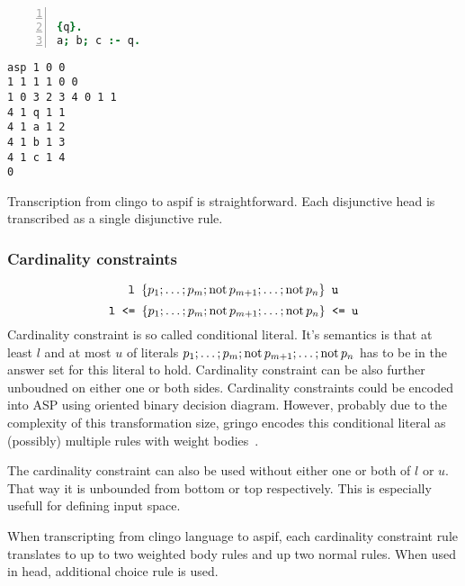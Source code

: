 \documentclass{fithesis}
\begin{document}
\begin{minipage}[t]{0.45\linewidth}
\centering
\begin{lstlisting}[language=prolog, numbers=left, countblanklines=false]

{q}.
a; b; c :- q.
\end{lstlisting}
\end{minipage}
\hspace{1em}
\begin{minipage}[t]{0.45\linewidth}
\centering
\begin{lstlisting}[numbers=right, countblanklines=false]
asp 1 0 0
1 1 1 1 0 0
1 0 3 2 3 4 0 1 1
4 1 q 1 1
4 1 a 1 2
4 1 b 1 3
4 1 c 1 4
0
\end{lstlisting}
\end{minipage}
Transcription from clingo to aspif is straightforward. Each disjunctive head
is transcribed as a single disjunctive rule.

\subsubsection{Cardinality constraints}

\begin{equation*}
    \texttt{l }\{p_1; \dots; p_m; \mathrm{not}\, p_{m+1}; \dots; \mathrm{not}\, p_n\}\texttt{ u}
\end{equation*}
\begin{equation*}
    \texttt{l <= }\{p_1; \dots; p_m; \mathrm{not}\, p_{m+1}; \dots; \mathrm{not}\, p_n\}\texttt{ <= u}
\end{equation*}
Cardinality constraint is so called conditional literal. It's semantics is that
at least $l$ and at most $u$ of literals
$p_1; \dots; p_m; \mathrm{not}\, p_{m+1}; \dots; \mathrm{not}\, p_n$
has to be in the answer set for this literal to hold.
Cardinality constraint can be also further unboudned on either one or both
sides. Cardinality constraints
could be encoded into ASP using oriented binary decision diagram.
However, probably due to the complexity of this transformation size, gringo
encodes this conditional literal as (possibly) multiple rules with weight
bodies~\cite{aspEasy2016}.

The cardinality constraint can also be used without either one or both of
$l$ or $u$. That way it is unbounded from bottom or top respectively. This
is especially usefull for defining input space.

When transcripting from clingo language to aspif, each cardinality constraint
rule translates to up to two weighted body rules and up two normal rules.
When used in head, additional choice rule is used.
\end{document}
